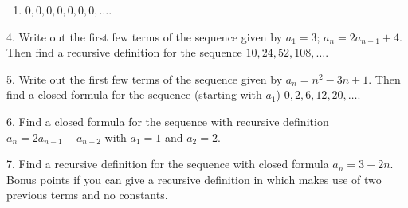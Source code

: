 \documentclass[10pt,]{book}
\theoremstyle{plain}
\theoremstyle{definition}
\theoremstyle{definition}
\theoremstyle{definition}
\numberwithin{equation}{chapter}
\begin{document}
\begin{exerciselist}
\begin{enumerate}[label=(\alph*)]
\item\hypertarget{li-868}{}\(0, 0 , 0 , 0 , 0 , 0 , 0 ,\ldots\).%
\end{enumerate}
\par\smallskip
\item[4.]\hypertarget{exercise-141}{}
          Write out the first few terms of the sequence given by \(a_1 = 3\); \(a_n = 2a_{n-1} + 4\). Then find a recursive definition for the sequence \(10, 24, 52, 108, \ldots\).
\par\smallskip
\item[5.]\hypertarget{exercise-142}{}
          Write out the first few terms of the sequence given by \(a_n = n^2 - 3n + 1\). Then find a closed formula for the sequence (starting with \(a_1\)) \(0, 2, 6, 12, 20, \ldots\).
\par\smallskip
\item[6.]\hypertarget{exercise-143}{}
          Find a closed formula for the sequence with recursive definition \(a_n = 2a_{n-1} - a_{n-2}\) with \(a_1 = 1\) and \(a_2 = 2\).
\par\smallskip
\item[7.]\hypertarget{exercise-144}{}
          Find a recursive definition for the sequence with closed formula \(a_n = 3 + 2n\). Bonus points if you can give a recursive definition in which makes use of two previous terms and no constants.
\par\smallskip
\end{exerciselist}
\typeout{************************************************}
\typeout{************************************************}
\end{document}
